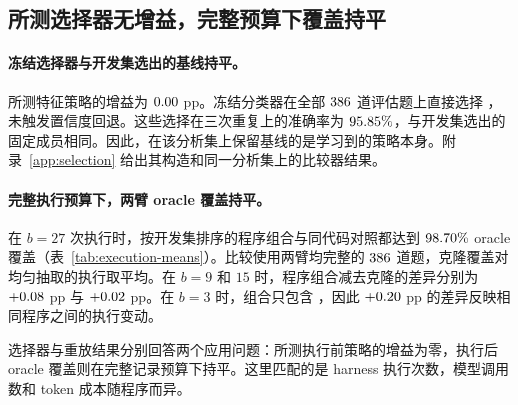\subsection{所测选择器无增益，完整预算下覆盖持平}\label{sec:utility}
\paragraph{冻结选择器与开发集选出的基线持平。}
所测特征策略的增益为 $0.00$ pp。冻结分类器在全部 $386$ 道评估题上直接选择 \bare{}，未触发置信度回退。这些选择在三次重复上的准确率为 $95.85\%$，与开发集选出的固定成员相同。因此，在该分析集上保留基线的是学习到的策略本身。附录~\ref{app:selection} 给出其构造和同一分析集上的比较器结果。

\paragraph{完整执行预算下，两臂 oracle 覆盖持平。}
\label{sec:selection-result}
在 $b=27$ 次执行时，按开发集排序的程序组合与同代码对照都达到 $98.70\%$ oracle 覆盖（表~\ref{tab:execution-means}）。比较使用两臂均完整的 $386$ 道题，克隆覆盖对均匀抽取的执行取平均。在 $b=9$ 和 $15$ 时，程序组合减去克隆的差异分别为 $+0.08$ pp 与 $+0.02$ pp。在 $b=3$ 时，组合只包含 \bare{}，因此 $+0.20$ pp 的差异反映相同程序之间的执行变动。

\begin{table}[htbp]
\centering\small

\caption{\textbf{在记录的执行中，完整预算下 oracle 覆盖持平。}每个入选成员贡献三次重复；克隆覆盖是从记录的 $27$ 次执行中均匀抽取子集的精确均值，并在共同完整任务上配对。两臂在相同 harness 执行次数下使用执行后正确性。}
\label{tab:execution-means}
\end{table}

选择器与重放结果分别回答两个应用问题：所测执行前策略的增益为零，执行后 oracle 覆盖则在完整记录预算下持平。这里匹配的是 harness 执行次数，模型调用数和 token 成本随程序而异。
